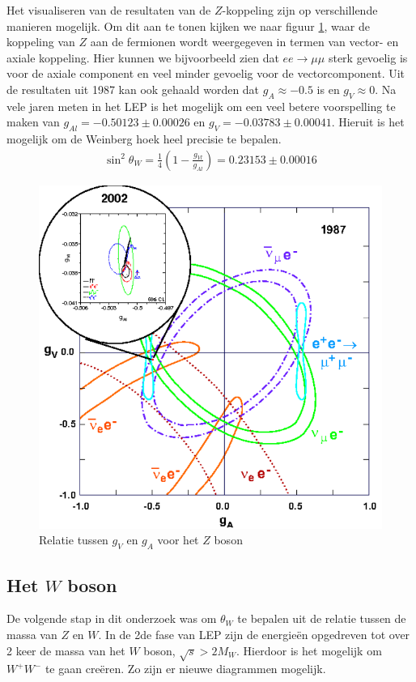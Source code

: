 \documentclass[../main.tex]{subfiles}
\begin{document}
Het visualiseren van de resultaten van de $Z$-koppeling zijn op verschillende manieren mogelijk. Om dit aan te tonen kijken we naar figuur \ref{fig:elektroweak_precision_tests/z_g_afhank}, waar de koppeling van $Z$ aan de fermionen wordt weergegeven in termen van vector- en axiale koppeling. Hier kunnen we bijvoorbeeld zien dat $ee\rightarrow\mu\mu$ sterk gevoelig is voor de axiale component en veel minder gevoelig voor de vectorcomponent. Uit de resultaten uit 1987 kan ook gehaald worden dat $g_A \approx -0.5$ is en $g_V\approx 0$. Na vele jaren meten in het LEP is het mogelijk om een veel betere voorspelling te maken van $g_{Al} = -0.50123\pm0.00026$ en $g_V=-0.03783\pm0.00041$. Hieruit is het mogelijk om de Weinberg hoek heel precisie te bepalen.
\begin{equation}
    \begin{aligned}
        \label{eq:weinberg_hoek}
        \sin^2\theta_W = \frac{1}{4} \left( 1 - \frac{g_{Vl}}{g_{Al}} \right) = 0.23153 \pm 0.00016
    \end{aligned}
\end{equation}

\begin{figure}[h]
    \centering
    \includegraphics[width=0.4\linewidth]{elektroweak_precision_tests/z_g_afhank.png}
    \caption{Relatie tussen $g_V$ en $g_A$ voor het $Z$ boson}%
    \label{fig:elektroweak_precision_tests/z_g_afhank}
\end{figure}

\subsection{Het $W$ boson}%
\label{sub:het_w_boson}

De volgende stap in dit onderzoek was om $\theta_W$ te bepalen uit de relatie tussen de massa van $Z$ en $W$. In de 2de fase van LEP zijn de energieën opgedreven tot over 2 keer de massa van het $W$ boson, $\sqrt{s} > 2M_W$. Hierdoor is het mogelijk om  $W^+W^-$ te gaan creëren. Zo zijn er nieuwe diagrammen mogelijk.
\end{document}
